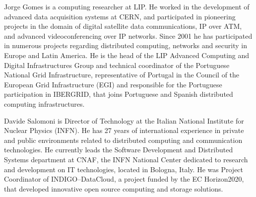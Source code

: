 \documentclass[journal]{IEEEtran}
\begin{document}
\begin{IEEEbiography}{Jorge Gomes}
is a computing researcher at LIP. He worked in the development of advanced data acquisition systems at CERN, and participated in pioneering projects in the domain of digital satellite data communications, IP over ATM, and advanced videoconferencing over IP networks. Since 2001 he has participated in numerous projects regarding distributed computing, networks and security in Europe and Latin America. He is the head of the LIP Advanced Computing and Digital Infrastructures Group and technical coordinator of the Portuguese National Grid Infrastructure, representative of Portugal in the Council of the European Grid Infrastructure (EGI) and responsible for the Portuguese participation in IBERGRID, that joins Portuguese and Spanish distributed computing infrastructures.
\end{IEEEbiography}

\begin{IEEEbiography}{Davide Salomoni}
is Director of Technology at the Italian National Institute for Nuclear Physics (INFN). He has 27 years of international experience in private and public environments related to distributed computing and communication technologies. He currently leads the Software Development and Distributed Systems department at CNAF, the INFN National Center dedicated to research and development on IT technologies, located in Bologna, Italy. He was Project Coordinator of INDIGO--DataCloud, a project funded by the EC Horizon2020, that developed innovative open source computing and storage solutions.
\end{IEEEbiography}
\end{document}
